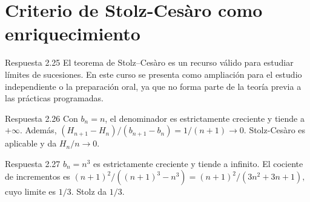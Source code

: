 \documentclass[10pt,a4paper,oneside,openany]{book}
\begin{document}
\section{Criterio de Stolz-Cesàro como enriquecimiento}
\begin{PSevenAnswerFixed}{Respuesta 2.25}
El teorema de Stolz–Cesàro es un recurso válido para estudiar límites de sucesiones. En este curso se presenta como ampliación para el estudio independiente o la preparación oral, ya que no forma parte de la teoría previa a las prácticas programadas.
\end{PSevenAnswerFixed}
\begin{PSevenAnswerFixed}{Respuesta 2.26}
Con \(b_n=n\), el denominador es estrictamente creciente y tiende a \(+\infty\). Además, \((H_{n+1}-H_n)/(b_{n+1}-b_n)=1/(n+1)\to0\). Stolz-Cesàro es aplicable y da \(H_n/n\to0\).
\end{PSevenAnswerFixed}
\begin{PSevenAnswerFixed}{Respuesta 2.27}
\(b_n=n^{3}\) es estrictamente creciente y tiende a infinito. El cociente de incrementos es \((n+1)^{2}/((n+1)^{3}-n^{3})=(n+1)^{2}/(3n^{2}+3n+1),\) cuyo limite es \(1/3\). Stolz da \(1/3\).
\end{PSevenAnswerFixed}
\end{document}
